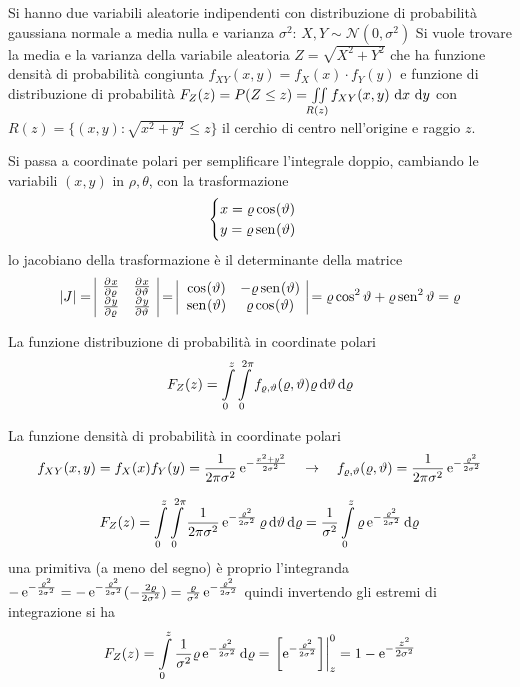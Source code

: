 \begin{esempio}
Si hanno due variabili aleatorie indipendenti con distribuzione di probabilità gaussiana normale a media nulla e varianza $\sigma^2$: $X,Y\sim\mathcal{N}(0,\sigma^2)$
Si vuole trovare la media e la varianza della variabile aleatoria $Z=\sqrt{X^2+Y^2}$ che ha funzione densità di probabilità congiunta $f_{XY}(x,y)=f_X(x)\cdot f_Y(y)$ e funzione di distribuzione di probabilità $F_Z(z)=P(Z\leq z)=\iint\limits_{R(z)}{f_{XY}(x,y)\,\diff x\,\diff y}$
con $R(z)=\{(x,y):\sqrt{x^2+y^2}\leq z\}$ il cerchio di centro nell'origine e raggio $z$.

Si	 passa a coordinate polari per semplificare l'integrale doppio, cambiando le variabili $(x,y)$ in $\rho,\theta$, con la trasformazione \[\begin{cases}
x = \rho\cos{\theta}\\y = \rho\sen{\theta}
\end{cases}\]
lo jacobiano della trasformazione è il determinante della matrice \[\abs{J}=\begin{array}{|cc|}
\pderiv{x}{\rho}&\pderiv{x}{\theta}  \\
\pderiv{y}{\rho}&\pderiv{y}{\theta}  \\ \end{array}=\begin{array}{|cc|}
\cos{\theta}&-\rho\sen{\theta}  \\
\sen{\theta}&\rho\cos{\theta}  \\
\end{array}=\rho\Cos^2\theta+\rho\Sen^2\theta=\rho\]

La funzione distribuzione di probabilità in coordinate polari
\[F_Z(z)=\intd{0}{z}{\intd{0}{2\pi}{f_{\rho,\theta}(\rho,\theta) \rho}{\theta}}{\rho}\]

La funzione densità di probabilità in coordinate polari
\[f_{XY}(x,y)=f_X(x) f_Y(y)=\frac{1}{2\pi\sigma^2}\e{-\frac{x^2+y^2}{2\sigma^2}}\quad\to\quad f_{\rho,\theta}(\rho,\theta)=\frac{1}{2\pi\sigma^2}\e{-\frac{\rho^2}{2\sigma^2}}\]

\[F_Z(z)=\intd{0}{z}{\intd{0}{2\pi}{\frac{1}{2\pi\sigma^2}\e{-\frac{\rho^2}{2\sigma^2}}\rho}{\theta}}{\rho}=\frac{1}{\sigma^2}\intd{0}{z}{\rho\e{-\frac{\rho^2}{2\sigma^2}}}{\rho}\]
una primitiva (a meno del segno) è proprio l'integranda $-\e{-\frac{\rho^2}{2\sigma^2}}=-\e{-\frac{\rho^2}{2\sigma^2}}(-\frac{2\rho}{2\sigma^2})=\frac{\rho}{\sigma^2}\e{-\frac{\rho^2}{2\sigma^2}}$ quindi invertendo gli estremi di integrazione si ha
\[F_Z(z)=\intd{0}{z}{\frac{1}{\sigma^2}\rho\e{-\frac{\rho^2}{2\sigma^2}}}{\rho}=\bound{z}{0}{\e{-\frac{\rho^2}{2\sigma^2}}}=1-\e{-\tfrac{z^2}{2\sigma^2}}\]


\end{esempio}
